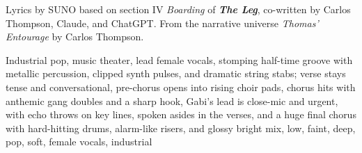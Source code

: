
\begin{notes}
Lyrics by SUNO based on section IV \emph{Boarding} of \emph{\bfseries The Leg}, %
co-written by Carlos Thompson, Claude, and ChatGPT. %
From the narrative universe \emph{Thomas’ Entourage} by Carlos Thompson.
\end{notes}
\begin{style}
Industrial pop, music theater, lead female vocals, stomping half-time groove with metallic percussion, clipped synth pulses, and dramatic string stabs; verse stays tense and conversational, pre-chorus opens into rising choir pads, chorus hits with anthemic gang doubles and a sharp hook, Gabi’s lead is close-mic and urgent, with echo throws on key lines, spoken asides in the verses, and a huge final chorus with hard-hitting drums, alarm-like risers, and glossy bright mix, low, faint, deep, pop, soft, female vocals, industrial
\end{style}
